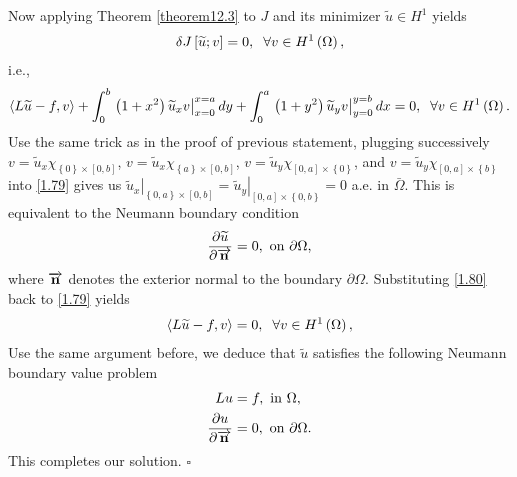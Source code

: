 \documentclass[11pt,a4paper]{article}
\numberwithin{equation}{section}
\numberwithin{equation}{section}
\begin{document}
\begin{enumerate}
Now applying Theorem \ref{theorem12.3} to $J$ and its minimizer $\widetilde u \in H^1$ yields
\begin{align}
\delta J\left[ {\widetilde u;v} \right] = 0, \hspace{0.2cm}\forall v \in {H^1}\left(\Omega\right),
\end{align}
i.e.,
\begin{align}
\label{1.79}
\left\langle {L\widetilde u - f,v} \right\rangle  + \int_0^b {\left. {\left( {1 + {x^2}} \right){{\widetilde u}_x}v} \right|_{x = 0}^{x = a}dy}  + \int_0^a {\left. {\left( {1 + {y^2}} \right){{\widetilde u}_y}v} \right|_{y = 0}^{y = b}dx}=0 , \hspace{0.2cm}\forall v \in {H^1}\left(\Omega\right).
\end{align}
Use the same trick as in the proof of previous statement, plugging successively $v = {{\widetilde u}_x}{\chi _{\left\{ 0 \right\} \times \left[ {0,b} \right]}}$, $v = {{\widetilde u}_x}{\chi _{\left\{ a \right\} \times \left[ {0,b} \right]}}$, $v = {{\widetilde u}_y}{\chi _{\left[ {0,a} \right] \times \left\{ 0 \right\}}}$, and $v = {{\widetilde u}_y}{\chi _{\left[ {0,a} \right] \times \left\{ b \right\}}}$ into \eqref{1.79} gives us ${\left. {{{\widetilde u}_x}} \right|_{\left\{ {0,a} \right\} \times \left[ {0,b} \right]}} = {\left. {{{\widetilde u}_y}} \right|_{\left[ {0,a} \right] \times \left\{ {0,b} \right\}}} = 0$ a.e. in $\bar \Omega$. This is equivalent to the Neumann boundary condition
\begin{align}
\label{1.80}
\frac{{\partial \widetilde u}}{{\partial \overrightarrow {\bf{n}} }} = 0,\mbox{ on }\partial \Omega ,
\end{align}
where $\overrightarrow {\bf{n}}$ denotes the exterior normal to the boundary $\partial \Omega$. Substituting \eqref{1.80} back to \eqref{1.79} yields 
\begin{align}
\left\langle {L\widetilde u - f,v} \right\rangle  = 0,\hspace{0.2cm}\forall v \in {H^1}\left(\Omega\right),
\end{align}
Use the same argument before, we deduce that $\widetilde u$ satisfies the following Neumann boundary value problem
\begin{align}
Lu &= f,\mbox{ in } \Omega ,\\
\frac{{\partial u}}{{\partial \overrightarrow {\bf{n}}}} &= 0,\mbox{ on } \partial \Omega .
\end{align}
This completes our solution. \hfill $\square$
\end{enumerate}
\end{document}
